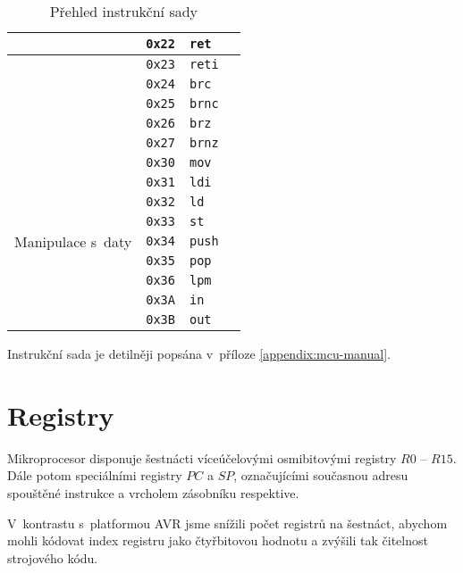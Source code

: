 \begin{table}[htbp]
\begin{center}
\begin{tabular}{| l | l | l | l |}
                         & \texttt{0x22} & \texttt{ret} \\ \hline
                         & \texttt{0x23} & \texttt{reti} \\ \hline
                         & \texttt{0x24} & \texttt{brc} \\ \hline
                         & \texttt{0x25} & \texttt{brnc} \\ \hline
                         & \texttt{0x26} & \texttt{brz} \\ \hline
                         & \texttt{0x27} & \texttt{brnz} \\
\hline
\multirow{9}{*}{Manipulace s~daty} & \texttt{0x30} & \texttt{mov} \\ \hline
                                   & \texttt{0x31} & \texttt{ldi} \\ \hline
                                   & \texttt{0x32} & \texttt{ld} \\ \hline
                                   & \texttt{0x33} & \texttt{st} \\ \hline
                                   & \texttt{0x34} & \texttt{push} \\ \hline
                                   & \texttt{0x35} & \texttt{pop} \\ \hline
                                   & \texttt{0x36} & \texttt{lpm} \\ \hline
                                   & \texttt{0x3A} & \texttt{in} \\ \hline
                                   & \texttt{0x3B} & \texttt{out} \\
\hline
\end{tabular}
\end{center}
\caption{Přehled instrukční sady}
\label{tbl:instruction-set}
\end{table}

Instrukční sada je detilněji popsána v~příloze \ref{appendix:mcu-manual}.

\section{Registry}

Mikroprocesor disponuje šestnácti víceúčelovými osmibitovými registry \( R0 \) -- \( R15 \). Dále potom speciálními registry \( PC \) a \( SP \), označujícími současnou adresu spouštěné instrukce a vrcholem zásobníku respektive.

V~kontrastu s~platformou AVR jsme snížili počet registrů na šestnáct, abychom mohli kódovat index registru jako čtyřbitovou hodnotu a zvýšili tak čitelnost strojového kódu.

